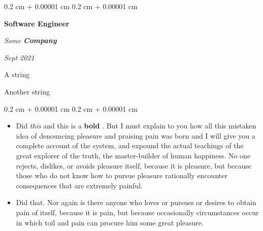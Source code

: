 \documentclass[10pt, letterpaper]{article}
\newenvironment{summary}{
    \begin{description}[
        topsep=0.10 cm,
        parsep=0.10 cm,
        partopsep=0pt,
        itemsep=0pt,
        leftmargin=0.4 cm + 10pt
    ]
}{
    \end{description}
} %
\newenvironment{highlights}{
    \begin{itemize}[
        topsep=0.10 cm,
        parsep=0.10 cm,
        partopsep=0pt,
        itemsep=0pt,
        leftmargin=0.4 cm + 10pt
    ]
}{
    \end{itemize}
} %
\newenvironment{onecolentry}{
    \begin{adjustwidth}{
        0.2 cm + 0.00001 cm
    }{
        0.2 cm + 0.00001 cm
    }
}{
    \end{adjustwidth}
} %
\newenvironment{twocolentry}[2][]{
    \onecolentry
    \def\secondColumn{#2}
    \setcolumnwidth{\fill, 4.5 cm}
    \begin{paracol}{2}
}{
    \switchcolumn \raggedleft \secondColumn
    \end{paracol}
    \endonecolentry
} %
\let\hrefWithoutArrow\href
\renewcommand{\href}[2]{\hrefWithoutArrow{#1}{\ifthenelse{\equal{#2}{}}{ }{#2 }\raisebox{.15ex}{\footnotesize \faExternalLink*}}}
\begin{document}
        \begin{twocolentry}{
            
            
        \textit{Sept 2021}}
            \textbf{Software Engineer}
            
            \textit{Some \textbf{Company}}
        \end{twocolentry}
            \begin{summary}
                \item A string
                \item Another string
            \end{summary}
        \vspace{0.10 cm}
        \begin{onecolentry}
            \begin{highlights}
                \item Did \textit{this} and this is a \textbf{bold} \href{https://example.com}{link}. But I must explain to you how all this mistaken idea of denouncing pleasure and praising pain was born and I will give you a complete account of the system, and expound the actual teachings of the great explorer of the truth, the master-builder of human happiness. No one rejects, dislikes, or avoids pleasure itself, because it is pleasure, but because those who do not know how to pursue pleasure rationally encounter consequences that are extremely painful.
                \item Did that. Nor again is there anyone who loves or pursues or desires to obtain pain of itself, because it is pain, but because occasionally circumstances occur in which toil and pain can procure him some great pleasure.
            \end{highlights}
        \end{onecolentry}


        \vspace{0.2 cm}
\end{document}
